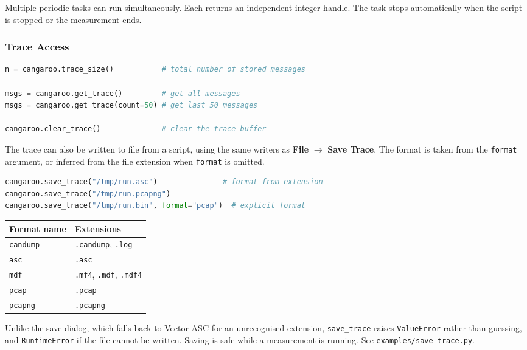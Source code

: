 \documentclass[a4paper,11pt]{article}
\newcommand{\ui}[1]{\textbf{#1}}
\newcommand{\file}[1]{\texttt{#1}}
\begin{document}
Multiple periodic tasks can run simultaneously. Each returns an independent
integer handle. The task stops automatically when the script is stopped or the
measurement ends.

\subsubsection{Trace Access}

\begin{lstlisting}[language=Python, caption={Read from the captured trace}]
n = cangaroo.trace_size()           # total number of stored messages

msgs = cangaroo.get_trace()         # get all messages
msgs = cangaroo.get_trace(count=50) # get last 50 messages

cangaroo.clear_trace()              # clear the trace buffer
\end{lstlisting}

The trace can also be written to file from a script, using the same writers as
\ui{File} $\rightarrow$ \ui{Save Trace}. The format is taken from the
\file{format} argument, or inferred from the file extension when \file{format}
is omitted.

\begin{lstlisting}[language=Python, caption={Save the trace to a file}]
cangaroo.save_trace("/tmp/run.asc")               # format from extension
cangaroo.save_trace("/tmp/run.pcapng")
cangaroo.save_trace("/tmp/run.bin", format="pcap")  # explicit format
\end{lstlisting}

\begin{tabular}{ll}
  \textbf{Format name} & \textbf{Extensions} \\
  \hline
  \file{candump} & \file{.candump}, \file{.log} \\
  \file{asc}     & \file{.asc} \\
  \file{mdf}     & \file{.mf4}, \file{.mdf}, \file{.mdf4} \\
  \file{pcap}    & \file{.pcap} \\
  \file{pcapng}  & \file{.pcapng} \\
\end{tabular}

\medskip
Unlike the save dialog, which falls back to Vector ASC for an unrecognised
extension, \file{save\_trace} raises \file{ValueError} rather than guessing, and
\file{RuntimeError} if the file cannot be written. Saving is safe while a
measurement is running. See \file{examples/save\_trace.py}.
\end{document}
